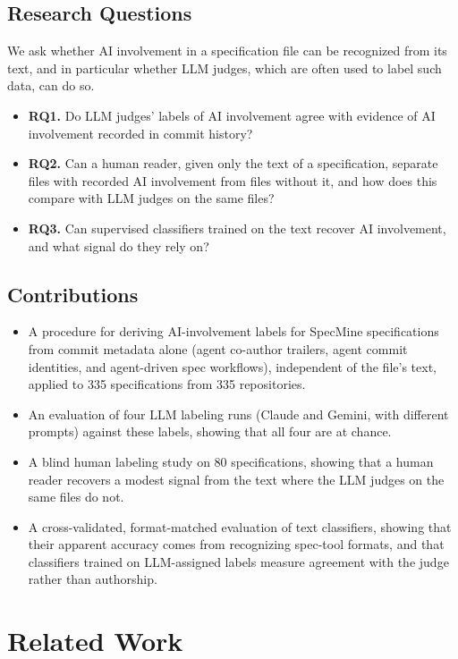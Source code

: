 \documentclass{article}
\begin{document}
\subsection{Research Questions}
We ask whether AI involvement in a specification file can be recognized from its text, and in particular whether LLM judges, which are often used to label such data, can do so.
\begin{itemize}
  \item \textbf{RQ1.} Do LLM judges' labels of AI involvement agree with evidence of AI involvement recorded in commit history?
  \item \textbf{RQ2.} Can a human reader, given only the text of a specification, separate files with recorded AI involvement from files without it, and how does this compare with LLM judges on the same files?
  \item \textbf{RQ3.} Can supervised classifiers trained on the text recover AI involvement, and what signal do they rely on?
\end{itemize}

\subsection{Contributions}
\begin{itemize}
  \item A procedure for deriving AI-involvement labels for SpecMine specifications from commit metadata alone (agent co-author trailers, agent commit identities, and agent-driven spec workflows), independent of the file's text, applied to 335 specifications from 335 repositories.
  \item An evaluation of four LLM labeling runs (Claude and Gemini, with different prompts) against these labels, showing that all four are at chance.
  \item A blind human labeling study on 80 specifications, showing that a human reader recovers a modest signal from the text where the LLM judges on the same files do not.
  \item A cross-validated, format-matched evaluation of text classifiers, showing that their apparent accuracy comes from recognizing spec-tool formats, and that classifiers trained on LLM-assigned labels measure agreement with the judge rather than authorship.
\end{itemize}

\section{Related Work}
\end{document}
